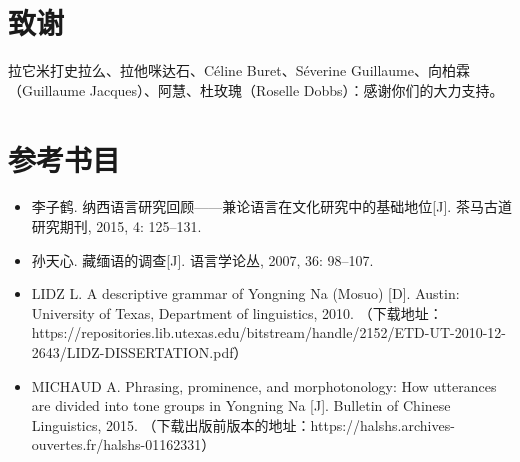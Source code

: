 \documentclass[oldfontcommands,oneside,a4paper,11pt]{article}
\newcommand{\zh}[1]{{\cn #1}}
\begin{document}
	\section{ \zh{致谢}} \label{sec:thks}
	
	\zh{拉它米打史拉么、拉他咪达石、}Céline Buret\zh{、}Séverine Guillaume\zh{、向柏霖（}Guillaume Jacques\zh{）、阿慧、杜玫瑰（}Roselle Dobbs\zh{）：感谢你们的大力支持。}	
	
	\section{\zh{参考书目}} \label{sec:refs}
	\begin{itemize}
		\item \zh{李子鹤. 纳西语言研究回顾——兼论语言在文化研究中的基础地位[J]. 茶马古道研究期刊, 2015, 4: 125–131.}
		\item \zh{孙天心. 藏缅语的调查[J]. 语言学论丛, 2007, 36: 98–107.}
		\item LIDZ L. A descriptive grammar of Yongning Na (Mosuo) [D]. Austin: University of Texas, Department of linguistics, 2010. 
		\zh{（下载地址：}https://repositories.lib.utexas.edu/bitstream/handle/2152/ETD-UT-2010-12-2643/LIDZ-DISSERTATION.pdf\zh{）}
		\item MICHAUD A. Phrasing, prominence, and morphotonology: How utterances are divided into tone groups in Yongning Na [J]. Bulletin of Chinese Linguistics, 2015. \zh{（下载出版前版本的地址：}https://halshs.archives-ouvertes.fr/halshs-01162331\zh{）}
	\end{itemize}
	
	
	
	
	
	
\end{document}
